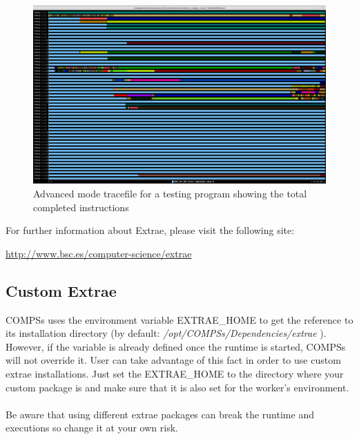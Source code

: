 \begin{landscape}
\begin{figure}[ht!]
  \centering
    \includegraphics[width=\linewidth]{./Sections/2_Execution/Figures/advanced.png}
    \caption{Advanced mode tracefile for a testing program showing the total completed instructions}
    \label{fig:advanced_trace}
\end{figure}
\end{landscape}

For further information about Extrae, please visit the following site: 
\begin{center}
\url{http://www.bsc.es/computer-science/extrae} 
\end{center}


\subsection{Custom Extrae}

COMPSs uses the environment variable EXTRAE\_HOME to get the reference to its installation directory (by default: \textit{/opt/COMPSs/Dependencies/extrae} ). However, if the variable is already defined once the runtime is started, COMPSs will not override it. User can take advantage of this fact in order to use custom extrae installations. Just set the EXTRAE\_HOME to the directory where your custom package is and make sure that it is also set for the worker's environment. 
\\
\\
Be aware that using different extrae packages can break the runtime and executions so change it at your own risk.